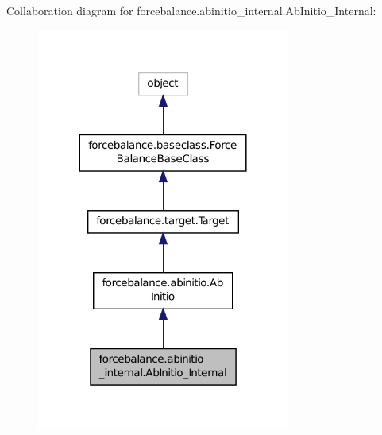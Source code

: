 Collaboration diagram for forcebalance.\-abinitio\-\_\-internal.\-Ab\-Initio\-\_\-\-Internal\-:\nopagebreak
\begin{figure}[H]
\begin{center}
\leavevmode
\includegraphics[width=236pt]{classforcebalance_1_1abinitio__internal_1_1AbInitio__Internal__coll__graph}
\end{center}
\end{figure}
